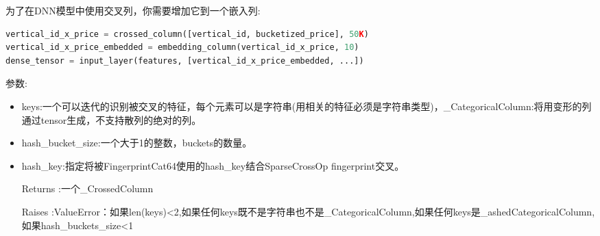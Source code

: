 为了在DNN模型中使用交叉列，你需要增加它到一个嵌入列:
\begin{lstlisting}[language=Python]
vertical_id_x_price = crossed_column([vertical_id, bucketized_price], 50K)
vertical_id_x_price_embedded = embedding_column(vertical_id_x_price, 10)
dense_tensor = input_layer(features, [vertical_id_x_price_embedded, ...])
\end{lstlisting}
参数:
\begin{itemize}
	\item keys:一个可以迭代的识别被交叉的特征，每个元素可以是字符串(用相关的特征必须是字符串类型)，\_CategoricalColumn:将用变形的列通过tensor生成，不支持散列的绝对的列。
	\item hash\_bucket\_size:一个大于1的整数，buckets的数量。
	\item hash\_key:指定将被FingerprintCat64使用的hash\_key结合SparseCrossOp fingerprint交叉。
	\item[Returns]:一个\_CrossedColumn
	\item[Raises]:ValueError：如果len(keys)<2,如果任何keys既不是字符串也不是\_CategoricalColumn,如果任何keys是\_ashedCategoricalColumn,如果hash\_buckets\_size<1
\end{itemize}
